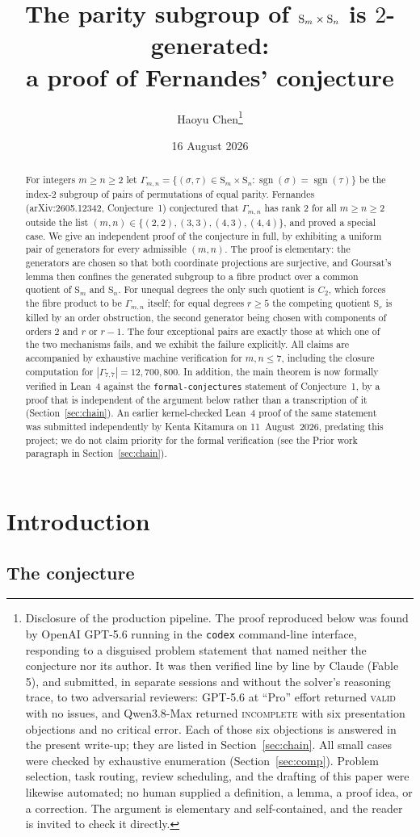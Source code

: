 \documentclass[11pt]{article}
\title{The parity subgroup of $\Sym_m \times \Sym_n$ is $2$-generated:\\
a proof of Fernandes' conjecture}
\author{Haoyu Chen\thanks{%
Disclosure of the production pipeline. The proof reproduced below was found by OpenAI GPT-5.6
running in the \texttt{codex} command-line interface, responding to a disguised problem
statement that named neither the conjecture nor its author. It was then verified line by line
by Claude (Fable 5), and submitted, in separate sessions and without the solver's reasoning
trace, to two adversarial reviewers: GPT-5.6 at ``Pro'' effort returned \textsc{valid} with no
issues, and Qwen3.8-Max returned \textsc{incomplete} with six presentation objections and no
critical error. Each of those six objections is answered in the present write-up; they are
listed in Section~\ref{sec:chain}. All small cases were checked by exhaustive enumeration
(Section~\ref{sec:comp}). Problem selection, task routing, review scheduling, and the drafting
of this paper were likewise automated; no human supplied a definition, a lemma, a proof idea,
or a correction. The argument is elementary and self-contained, and the reader is invited to
check it directly.}}
\date{16 August 2026}
\theoremstyle{plain}
\theoremstyle{definition}
\theoremstyle{remark}
\numberwithin{equation}{section}
\newcommand{\Sym}{\mathrm{S}}
\newcommand{\Gam}{\Gamma}
\DeclareMathOperator{\sgn}{sgn}
\begin{document}
\maketitle

\begin{abstract}
For integers $m \ge n \ge 2$ let
$\Gam_{m,n} = \{(\sigma,\tau) \in \Sym_m \times \Sym_n : \sgn(\sigma) = \sgn(\tau)\}$
be the index-$2$ subgroup of pairs of permutations of equal parity. Fernandes
(arXiv:2605.12342, Conjecture~1) conjectured that $\Gam_{m,n}$ has rank $2$ for all
$m \ge n \ge 2$ outside the list $(m,n) \in \{(2,2),(3,3),(4,3),(4,4)\}$, and proved a special
case. We give an independent proof of the conjecture in full, by exhibiting a uniform pair of generators for every
admissible $(m,n)$. The proof is elementary: the generators are chosen so that both coordinate
projections are surjective, and Goursat's lemma then confines the generated subgroup to a fibre
product over a common quotient of $\Sym_m$ and $\Sym_n$. For unequal degrees the only such
quotient is $C_2$, which forces the fibre product to be $\Gam_{m,n}$ itself; for equal degrees
$r \ge 5$ the competing quotient $\Sym_r$ is killed by an order obstruction, the second
generator being chosen with components of orders $2$ and $r$ or $r-1$. The four exceptional
pairs are exactly those at which one of the two mechanisms fails, and we exhibit the failure
explicitly. All claims are accompanied by exhaustive machine verification for $m,n \le 7$,
including the closure computation for $|\Gam_{7,7}| = 12{,}700{,}800$. In addition, the main
theorem is now formally verified in Lean~4 against the \texttt{formal-conjectures} statement of
Conjecture~1, by a proof that is independent of the argument below rather than a transcription of
it (Section~\ref{sec:chain}). An earlier kernel-checked Lean~4 proof of the same statement was
submitted independently by Kenta Kitamura on 11~August~2026, predating this project; we do not
claim priority for the formal verification (see the Prior work paragraph in
Section~\ref{sec:chain}).
\end{abstract}

\section{Introduction}
\label{sec:intro}

\subsection{The conjecture}
\end{document}
